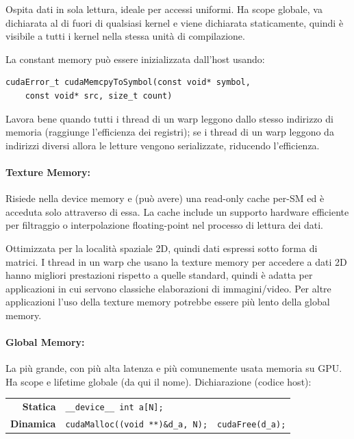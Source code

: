 Ospita dati in sola lettura, ideale per accessi uniformi. Ha scope globale, va dichiarata al di fuori di qualsiasi kernel e viene dichiarata staticamente, quindi è visibile a tutti i kernel nella stessa unità di compilazione.

La constant memory può essere inizializzata dall'host usando:
\begin{verbatim}
cudaError_t cudaMemcpyToSymbol(const void* symbol,
    const void* src, size_t count)
\end{verbatim}

Lavora bene quando tutti i thread di un warp leggono dallo stesso indirizzo di memoria (raggiunge l'efficienza dei registri); se i thread di un warp leggono da indirizzi diversi allora le letture vengono serializzate, riducendo l'efficienza.

\paragraph{Texture Memory:} Risiede nella device memory e (può avere) una read-only cache per-SM ed è acceduta solo attraverso di essa. La cache include un supporto hardware efficiente per filtraggio o interpolazione floating-point nel processo di lettura dei dati. 

Ottimizzata per la località spaziale 2D, quindi dati espressi sotto forma di matrici. I thread in un warp che usano la texture memory per accedere a dati 2D hanno migliori prestazioni rispetto a quelle standard, quindi è adatta per applicazioni in cui servono classiche elaborazioni di immagini/video. Per altre applicazioni l’uso della texture memory potrebbe essere più lento della global memory.

\paragraph{Global Memory:} La più grande, con più alta latenza e più comunemente usata memoria su GPU. Ha scope e lifetime globale (da qui il nome). Dichiarazione (codice host):
\begin{center}
	\begin{tabular}{r | l r | }
		\cline{2-3}
		\textbf{Statica} & \texttt{\_\_device\_\_ int a[N];} & \\
		\textbf{Dinamica} & \texttt{cudaMalloc((void **)\&d\_a, N);} & \texttt{cudaFree(d\_a);} \\
		\cline{2-3}
	\end{tabular}
\end{center}

